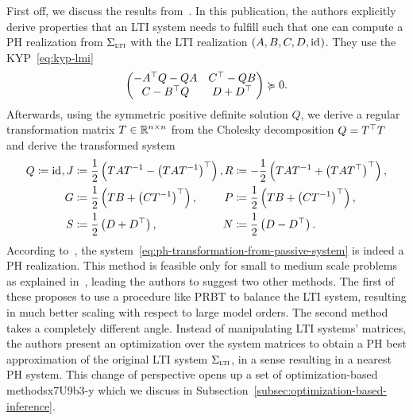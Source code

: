 First off, we discuss the results from~\cite{Beattie2022}.
In this publication, the authors explicitly derive properties that an \ac{LTI} system needs to fulfill such that one can compute a \ac{PH} realization from $\Sigma_{\textnormal{\scshape lti}}$ with the \ac{LTI} realization $(A, B, C, D, \text{id}_{})$.
They use the \ac{KYP}~\eqref{eq:kyp-lmi}
\begin{equation*}
    \begin{pmatrix}
        - A^{\top} Q - Q A & C^{\top} - QB \\
        C - B^{\top} Q & D + D^{\top}
    \end{pmatrix} \succcurlyeq 0.
\end{equation*}
Afterwards, using the symmetric positive definite solution $Q$, we derive a regular transformation matrix $T \in \mathbb{R}^{n \times n}$ from the Cholesky decomposition $Q = T^{\top} T$ and derive the transformed system
\begin{equation}\label{eq:ph-transformation-from-passive-system}
    \begin{alignedat}{8}
        Q &\coloneqq \id, &J &\coloneqq \frac{1}{2} \left( T A T\inv - {\left( T A T\inv \right)}\trans \right), &R &\coloneqq -\frac{1}{2} \left( T A T\inv + {\left( T A T\trans \right)}\trans \right), \\
        & &G &\coloneqq \frac{1}{2} \left( T B + {\left( C T\inv \right)}\trans \right), &P &\coloneqq \frac{1}{2} \left( T B + {\left( C T\inv \right)}\trans \right), \\
        & &S &\coloneqq \frac{1}{2} \left( D + D\trans \right), &N &\coloneqq \frac{1}{2} \left( D - D\trans \right).
    \end{alignedat}
\end{equation}
According to~\cite{Beattie2011}, the system~\eqref{eq:ph-transformation-from-passive-system} is indeed a \ac{PH} realization.
This method is feasible only for small to medium scale problems as explained in~\cite{Cherifi2019}, leading the authors to suggest two other methods.
The first of these proposes to use a procedure like \ac{PRBT} to balance the \ac{LTI} system, resulting in much better scaling with respect to large model orders.
The second method takes a completely different angle.
Instead of manipulating \ac{LTI} systems' matrices, the authors present an optimization over the system matrices to obtain a \ac{PH} best approximation of the original \ac{LTI} system $\Sigma_{\textnormal{\scshape lti}}$, in a sense resulting in a nearest \ac{PH} system.
This change of perspective opens up a set of optimization-based methodsx7U9b3-y
 which we discuss in Subsection~\ref{subsec:optimization-based-inference}.

